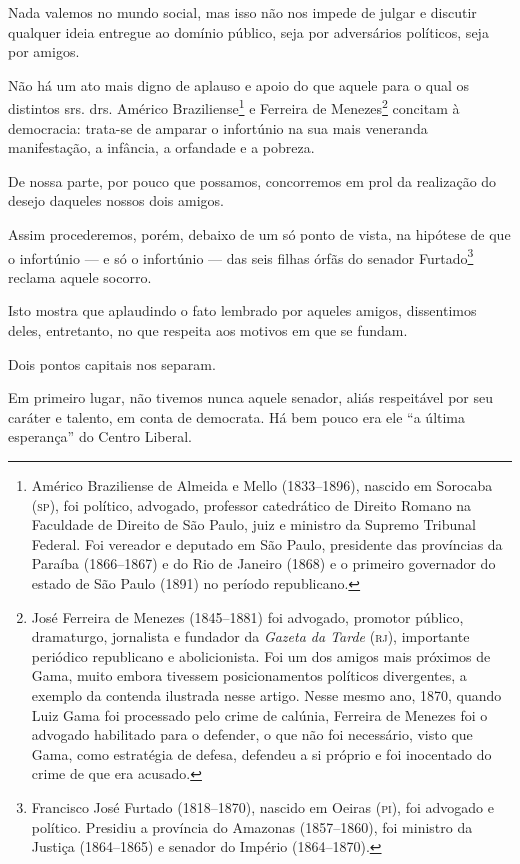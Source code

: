 Nada valemos no mundo social, mas isso não nos impede de julgar e
discutir qualquer ideia entregue ao domínio público, seja por
adversários políticos, seja por amigos.

Não há um ato mais digno de aplauso e apoio do que aquele para o qual os
distintos srs. drs. Américo Braziliense\footnote{ Américo Braziliense
  de Almeida e Mello (1833--1896), nascido em Sorocaba (\textsc{sp}), foi
  político, advogado, professor catedrático de Direito Romano na
  Faculdade de Direito de São Paulo, juiz e ministro da Supremo Tribunal
  Federal. Foi vereador e deputado em São Paulo, presidente das
  províncias da Paraíba (1866--1867) e do Rio de Janeiro (1868) e o
  primeiro governador do estado de São Paulo (1891) no período
  republicano.} e Ferreira de Menezes\footnote{ José Ferreira de
  Menezes (1845--1881) foi advogado, promotor público, dramaturgo,
  jornalista e fundador da \emph{Gazeta da Tarde} (\textsc{rj}), importante
  periódico republicano e abolicionista. Foi um dos amigos mais próximos
  de Gama, muito embora tivessem posicionamentos políticos divergentes,
  a exemplo da contenda ilustrada nesse artigo. Nesse mesmo ano, 1870,
  quando Luiz Gama foi processado pelo crime de calúnia, Ferreira de
  Menezes foi o advogado habilitado para o defender, o que não foi
  necessário, visto que Gama, como estratégia de defesa, defendeu a si
  próprio e foi inocentado do crime de que era acusado.} concitam à
democracia: trata-se de amparar o infortúnio na sua mais veneranda
manifestação, a infância, a orfandade e a pobreza.

De nossa parte, por pouco que possamos, concorremos em prol da
realização do desejo daqueles nossos dois amigos.

Assim procederemos, porém, debaixo de um só ponto de vista, na hipótese
de que o infortúnio --- e só o infortúnio --- das seis filhas órfãs do
senador Furtado\footnote{ Francisco José Furtado (1818--1870), nascido
  em Oeiras (\textsc{pi}), foi advogado e político. Presidiu a província do
  Amazonas (1857--1860), foi ministro da Justiça (1864--1865) e senador do
  Império (1864--1870).} reclama aquele socorro.

Isto mostra que aplaudindo o fato lembrado por aqueles amigos,
dissentimos deles, entretanto, no que respeita aos motivos em que se
fundam.

Dois pontos capitais nos separam.

Em primeiro lugar, não tivemos nunca aquele senador, aliás respeitável
por seu caráter e talento, em conta de democrata. Há bem pouco era ele
``a última esperança'' do Centro Liberal.

